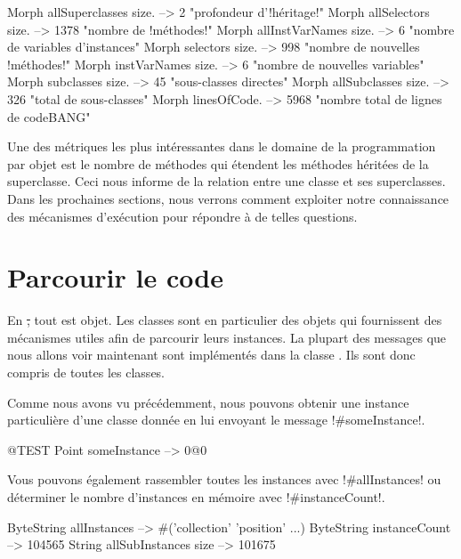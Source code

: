 \documentclass[a4paper,10pt,twoside]{book}
\begin{document}
\begin{code}{}
Morph allSuperclasses size.  -->       2 "profondeur d'!héritage!"
Morph allSelectors size.        --> 1378 "nombre de !méthodes!"
Morph allInstVarNames size. -->      6 "nombre de variables d'instances"
Morph selectors size.             -->  998 "nombre de nouvelles !méthodes!"
Morph instVarNames size.     -->      6 "nombre de nouvelles variables"
Morph subclasses size.          -->    45 "sous-classes directes"
Morph allSubclasses size.      -->  326 "total de sous-classes"
Morph linesOfCode.               --> 5968 "nombre total de lignes de codeBANG"
\end{code}

Une des métriques les plus intéressantes dans le domaine de la programmation par objet est le nombre de méthodes qui étendent les méthodes héritées de la superclasse. Ceci nous informe de la relation entre une classe et ses superclasses.
Dans les prochaines sections, nous verrons comment exploiter notre connaissance des mécanismes d'exécution pour répondre à de telles questions.

\section{Parcourir le code}

En \st, tout est objet. Les classes sont en particulier des objets qui fournissent des mécanismes utiles afin de parcourir leurs instances.
La plupart des messages que nous allons voir maintenant sont implémentés dans la classe . Ils sont donc compris de toutes les classes.

Comme nous avons vu précédemment, nous pouvons obtenir une instance particulière d'une classe donnée en lui envoyant le message \ct!#someInstance!.
\begin{code}{@TEST} %
Point someInstance --> 0@0
\end{code}

Vous pouvons également rassembler toutes les instances avec \ct!#allInstances! ou déterminer le nombre d'instances en mémoire avec \ct!#instanceCount!.

\begin{code}{} %
ByteString allInstances        --> #('collection' 'position'  ...)
ByteString instanceCount    --> 104565
String allSubInstances size -->  101675
\end{code}
\end{document}
